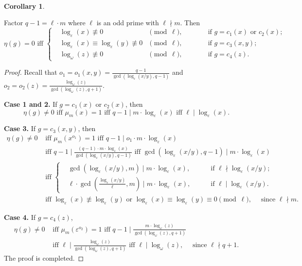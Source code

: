 \documentclass[12pt, reqno]{amsart}
\theoremstyle{definition}
\newtheorem{corollary}[theorem]{Corollary}
\theoremstyle{remark}
\numberwithin{equation}{section}
\newcommand{\pt}[1]{\left(#1\right)}
\begin{document}
\begin{corollary}\label{derangements}
	
	Factor $q - 1 = \ell \cdot m$ where $\ell$ is an odd prime with $\ell \nmid m$. Then
	\[\eta(g) = 0 \text{ iff } \left\{\begin{aligned}
		&\log_\varepsilon(x) \not\equiv 0 &\pmod \ell,&\quad&&\text{ if } g = c_1(x) \text{ or } c_2(x);\\
		&\log_\varepsilon(x) \equiv \log_\varepsilon(y) \not\equiv 0 &\pmod \ell,&\quad&&\text{ if } g = c_3(x, y);\\
		&\log_\omega(z) \not\equiv 0 &\pmod \ell,&\quad&&\text{ if } g = c_4(z).
	\end{aligned}\right.\]	
	
\end{corollary}

\begin{proof}
	
	Recall that $o_1 = o_1(x, y) = \frac{q - 1}{\gcd\pt{\log_\varepsilon(x/y), q - 1}}$ and $o_2 = o_2(z) = \frac{\log_\omega(z)}{\gcd\pt{\log_\omega(z), q + 1}}$.
	
	\textbf{Case 1 and 2.} If $g = c_1(x)$ or $c_2(x)$, then
	\[\eta(g) \ne 0 \text{ iff } \mu_m(x) = 1 \text{ iff } q - 1 \mid m \cdot \log_\varepsilon(x) \text{ iff } \ell \mid \log_\varepsilon(x).\]
	
	\textbf{Case 3.} If $g = c_3(x, y)$, then
	\[\begin{aligned}
		\eta(g) \ne 0
		&\text{ iff } \mu_{m}(x^{o_1}) = 1 
		\text{ iff } q - 1 \mid o_1 \cdot m\cdot \log_\varepsilon(x)\\
		&\text{ iff } q - 1 \mid \frac{(q - 1) \cdot m \cdot \log_\varepsilon(x)}{\gcd(\log_\varepsilon(x/y), q - 1)}
		\text{ iff } \gcd(\log_\varepsilon(x/y), q - 1) \mid m\cdot \log_\varepsilon(x)\\
		&\text{ iff } \left\{\begin{aligned}
			&\gcd\pt{\log_\varepsilon(x/y), m}\mid m\cdot \log_\varepsilon(x),&\quad&\text{ if } \ell \nmid \log_\varepsilon(x/y);\\
			&\ell\cdot\gcd\pt{\frac{\log_\varepsilon(x/y)}{\ell}, m}\mid m \cdot \log_\varepsilon(x),&\quad&\text{ if } \ell \mid \log_\varepsilon(x/y).
		\end{aligned}\right.\\
		&\text{ iff } \log_\varepsilon(x) \not\equiv \log_\varepsilon(y) \text{ or } \log_\varepsilon(x) \equiv \log_\varepsilon(y) \equiv 0 \pmod{\ell}, \quad \text{ since } \ell \nmid m.
	\end{aligned}\]
	
	\textbf{Case 4.} If $g = c_4(z)$,
	\[\begin{aligned}
		\eta(g) \ne 0
		&\text{ iff } \mu_m\pt{\varepsilon^{o_2}} = 1 
		\text{ iff } q - 1 \mid \frac{m \cdot \log_\omega(z)}{\gcd(\log_\omega(z), q + 1)} \\
		&\text{ iff } \ell \mid \frac{\log_\omega(z)}{\gcd(\log_\omega(z), q + 1)} 
		\text{ iff } \ell \mid \log_\omega(z), \quad \text{ since } \ell \nmid q + 1.
	\end{aligned}\]
	The proof is completed.\qedhere	
\end{proof}
\end{document}
